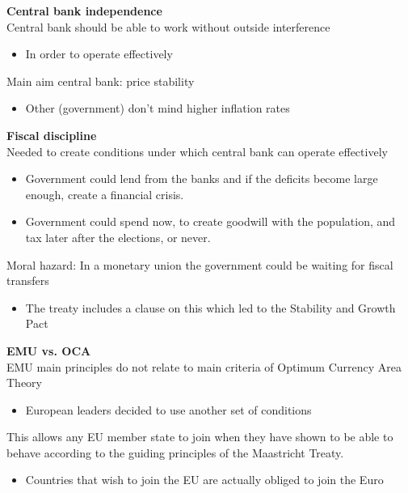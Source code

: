 \documentclass{beamer}
\begin{document}
\begin{frame}
  \textbf{Central bank independence}\\
  Central bank should be able to work without outside interference
  \begin{itemize}
    \item In order to operate effectively
  \end{itemize}
  \medskip
  Main aim central bank: price stability
  \begin{itemize}
    \item Other (government) don't mind higher inflation rates
  \end{itemize}
\end{frame}

\begin{frame}
  \textbf{Fiscal discipline}\\
  Needed to create conditions under which central bank can operate effectively
  \begin{itemize}
    \item Government could lend from the banks and if the deficits become large enough, create a financial crisis. 
    \item Government could spend now, to create goodwill with the population, and tax later after the elections, or never.  
  \end{itemize}
   Moral hazard: In a monetary union the government could be waiting for fiscal transfers
   \begin{itemize}
     \item The treaty includes a clause on this which led to the Stability and Growth Pact 
   \end{itemize}    
\end{frame}


\begin{frame} 
  \textbf{EMU vs. OCA}\\
  EMU main principles do not relate to main criteria of Optimum Currency Area Theory
  \begin{itemize}
    \item European leaders decided to use another set of conditions
  \end{itemize}
This allows any EU member state to join when they have shown to be able to behave according to the guiding principles of the Maastricht Treaty.
\begin{itemize}
  \item Countries that wish to join the EU are actually obliged to join the Euro
\end{itemize}
\end{frame}
\end{document}

